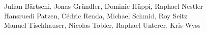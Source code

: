 %
%
%
Julian Bärtschi,
Jonas Gründler,
Dominic Hüppi,
Raphael Nestler%
\\
Hansruedi Patzen,
Cédric Renda,
Michael Schmid,
Roy Seitz%
\\
Manuel Tischhauser,
Nicolas Tobler,
Raphael Unterer,
Kris Wyss%
